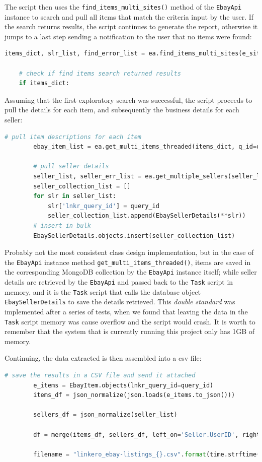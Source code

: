The script then uses the \texttt{find\_items\_multi\_sites()} method of the
\texttt{EbayApi} instance to search and pull all items that match the criteria
input by the user. If the search returns results, the script continues to
generate the report, otherwise it jumps to a last step sending a notification
to the user that no items were found:
 \begin{lstlisting}[language=Python, breaklines=true]
    items_dict, slr_list, find_error_list = ea.find_items_multi_sites(e_sites=ebay_sites, kwd=keywords, s_id=seller_id, s_desc=search_desc)
    
    # check if find items search returned results
    if items_dict:
\end{lstlisting}

Assuming that the first exploratory search was successful, the script proceeds
to pull the details for each item, and subsequently the business details for
each seller:
\begin{lstlisting}[language=Python, breaklines=true]
		# pull item descriptions for each item
		ebay_item_list = ea.get_multi_items_threaded(items_dict, q_id=query_id)
        
        # pull seller details
        seller_list, seller_err_list = ea.get_multiple_sellers(seller_list=slr_list)
        seller_collection_list = []
        for slr in seller_list:
            slr['lnkr_query_id'] = query_id
            seller_collection_list.append(EbaySellerDetails(**slr))
        # insert in bulk
        EbaySellerDetails.objects.insert(seller_collection_list)
\end{lstlisting}
Probably not the most consistent class design implementation, but in the case of
the \texttt{EbayApi} instance method \texttt{get\_multi\_items\_threaded()},
items are saved in the corresponding MongoDB collection by the \texttt{EbayApi}
instance itself; while seller details are retrieved by the \texttt{EbayApi} and
passed back to the \texttt{Task} script in memory, and it is the \texttt{Task}
script that calls the database object \texttt{EbaySellerDetails} to save the
details retrieved. This \emph{double standard} was implemented after a series of
tests, when we found that leaving the data in the \texttt{Task} script memory
was cause overflow and the script would crash. It is worth to remember that the
system that is currently running this project only has 1GB of memory.

Continuing, the data extracted is then assembled into a csv file:
\begin{lstlisting}[language=Python, breaklines=true]
        # save the results in a CSV file and send it attached
        e_items = EbayItem.objects(lnkr_query_id=query_id)
        items_df = json_normalize(json.loads(e_items.to_json()))
        
        sellers_df = json_normalize(seller_list)
        
        df = merge(items_df, sellers_df, left_on='Seller.UserID', right_on='UserID')
        
        filename = "linkero_ebay-listings_{}.csv".format(time.strftime("%Y%m%d-%H%M"))
\end{lstlisting}

